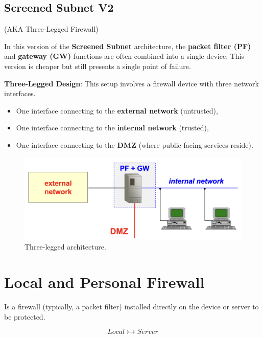 \subsection{Screened Subnet V2}
\begin{center}
    (AKA Three-Legged Firewall)
\end{center}

\noindent In this version of the \textbf{Screened Subnet} architecture, the \textbf{packet filter (PF)} and \textbf{gateway (GW)} functions are often combined into a single device. This version is cheaper but still presents a single point of failure.

\hfill 

\noindent\textbf{Three-Legged Design}: This setup involves a firewall device with three network interfaces.
\begin{itemize}
    \item One interface connecting to the \textbf{external network} (untrusted),
    \item One interface connecting to the \textbf{internal network} (trusted),
    \item One interface connecting to the \textbf{DMZ} (where public-facing services reside).
\end{itemize}

\begin{figure}[H]
    \centering
    \includegraphics[width=0.5\linewidth]{Images/Firewalling/screened_subnet_v2.png}
    \caption{Three-legged architecture.}
\end{figure}










\section{Local and Personal Firewall}
Is a firewall (typically, a packet filter) installed directly on the device or server to be protected.

\[
Local \rightarrowtail Server
\]

